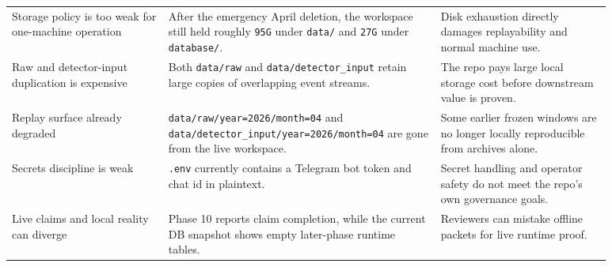 \documentclass{article}
\begin{document}
\begin{longtable}{p{0.23\linewidth}p{0.40\linewidth}p{0.25\linewidth}}
Storage policy is too weak for one-machine operation & After the emergency April deletion, the workspace still held roughly \texttt{95G} under \texttt{data/} and \texttt{27G} under \texttt{database/}. & Disk exhaustion directly damages replayability and normal machine use. \\
Raw and detector-input duplication is expensive & Both \texttt{data/raw} and \texttt{data/detector\_input} retain large copies of overlapping event streams. & The repo pays large local storage cost before downstream value is proven. \\
Replay surface already degraded & \texttt{data/raw/year=2026/month=04} and \texttt{data/detector\_input/year=2026/month=04} are gone from the live workspace. & Some earlier frozen windows are no longer locally reproducible from archives alone. \\
Secrets discipline is weak & \texttt{.env} currently contains a Telegram bot token and chat id in plaintext. & Secret handling and operator safety do not meet the repo's own governance goals. \\
Live claims and local reality can diverge & Phase 10 reports claim completion, while the current DB snapshot shows empty later-phase runtime tables. & Reviewers can mistake offline packets for live runtime proof. \\
\end{longtable}
\end{document}

